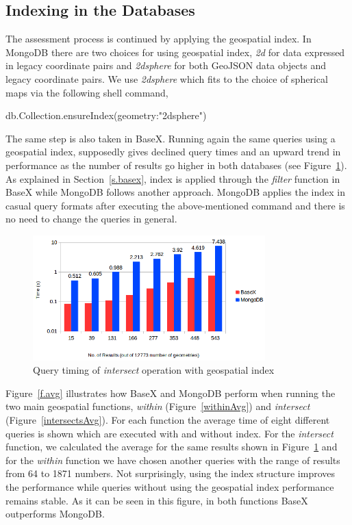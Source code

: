 \documentclass[a4paper,12pt]{article}
\begin{document}
\subsection{Indexing in the Databases}
\label{index}
The assessment process is continued by applying the geospatial index. In MongoDB there are two choices for using geospatial index, \textit{2d} for data expressed in legacy coordinate pairs and \textit{2dsphere} for both GeoJSON data objects and legacy coordinate pairs. We use \textit{2dsphere} which fits to the choice of spherical maps via the following shell command,
\vspace{10px}
\begin{fakeJSON}
db.Collection.ensureIndex({geometry:"2dsphere"}) 
\end{fakeJSON}
\vspace{10px}
The same step is also taken in BaseX. Running again the same queries using a geospatial index, supposedly gives declined query times and an upward trend in performance as the number of results go higher in both databases (see Figure~\ref{figBXvsMongoIndexIntersects}). As explained in Section~\ref{s.basex}, index is applied through the \textit{filter} function in BaseX while MongoDB follows another approach. MongoDB applies the index in casual query formats after executing the above-mentioned command and there is no need to change the queries in general.
\begin{figure}
\centering
\includegraphics[width=0.8\textwidth]{BXvsMongo-Intersects-Index-Sec-log-newColor}
\caption{Query timing of \textit{intersect} operation with geospatial index}
\label{figBXvsMongoIndexIntersects}
\end{figure}
Figure~\ref{f.avg} illustrates how BaseX and MongoDB perform when running the two main geospatial functions, \textit{within} (Figure~\ref{withinAvg}) and \textit{intersect} (Figure~\ref{intersectsAvg}). For each function the average time of eight different queries is shown which are executed with and without index. For the \textit{intersect} function, we calculated the average for the same results shown in Figure~\ref{figBXvsMongoIndexIntersects} and for the \textit{within} function we have chosen another queries with the range of results from 64 to 1871 numbers.
Not surprisingly, using the index structure improves the performance while queries without using the geospatial index performance remains stable. As it can be seen in this figure, in both functions BaseX outperforms MongoDB.
\end{document}
